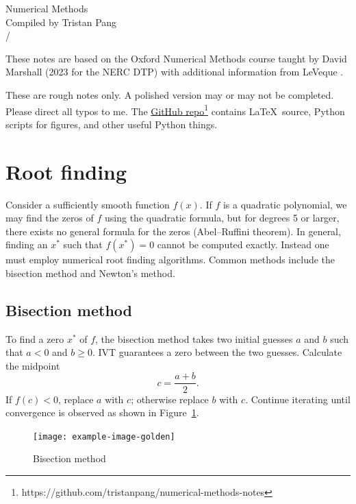 \documentclass[11pt, a4paper]{article}
\theoremstyle{break}
\begin{document}
\begin{center}
{\LARGE Numerical Methods}\\
{\large Compiled by Tristan Pang}\\
{\the\month/\the\year}
\end{center}
These notes are based on the Oxford Numerical Methods course taught by David Marshall (2023 for the NERC DTP) with additional information from LeVeque \cite{leveque_finite_2007}.

These are rough notes only. A polished version may or may not be completed. Please direct all typos to me. The \href{https://github.com/tristanpang/numerical-methods-notes}{GitHub repo}\footnote{https://github.com/tristanpang/numerical-methods-notes} contains \LaTeX\ source, Python scripts for figures, and other useful Python things.

\tableofcontents



\section{Root finding}
Consider a sufficiently smooth function $f(x)$. If $f$ is a quadratic polynomial, we may find the zeros of $f$ using the quadratic formula, but for degrees 5 or larger, there exists no general formula for the zeros (Abel–Ruffini theorem). In general, finding an $x^*$ such that $f(x^*)=0$ cannot be computed exactly. Instead one must employ numerical root finding algorithms. Common methods include the bisection method and Newton's method.

\subsection{Bisection method}
To find a zero $x^*$ of $f$, the bisection method takes two initial guesses $a$ and $b$ such that $a<0$ and $b\geq0$. IVT guarantees a zero between the two guesses. Calculate the midpoint \[c=\frac{a+b}2.\] If $f(c)<0$, replace $a$ with $c$; otherwise replace $b$ with $c$. Continue iterating until convergence is observed as shown in Figure~\ref{fig:bisection}.

\begin{figure}\centering
	\texttt{[image: example-image-golden]}
	\caption{Bisection method}\label{fig:bisection}
\end{figure}
\end{document}
